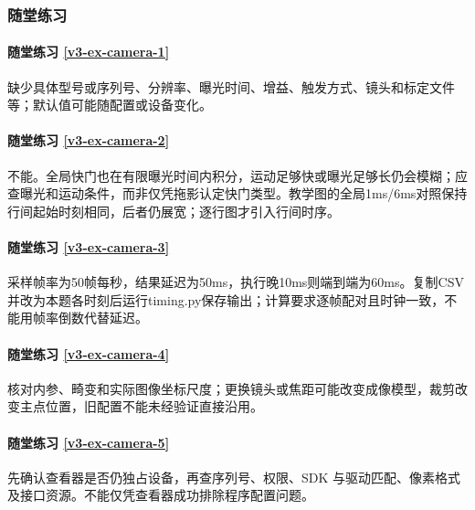 \subsubsection*{随堂练习}
\paragraph*{随堂练习 \ref{v3-ex-camera-1}}
\begin{solution}
缺少具体型号或序列号、分辨率、曝光时间、增益、触发方式、镜头和标定文件等；默认值可能随配置或设备变化。
\end{solution}

\paragraph*{随堂练习 \ref{v3-ex-camera-2}}
\begin{solution}
不能。全局快门也在有限曝光时间内积分，运动足够快或曝光足够长仍会模糊；应查曝光和运动条件，而非仅凭拖影认定快门类型。教学图的全局1ms/6ms对照保持行间起始时刻相同，后者仍展宽；逐行图才引入行间时序。
\end{solution}

\paragraph*{随堂练习 \ref{v3-ex-camera-3}}
\begin{solution}
采样帧率为50帧每秒，结果延迟为50ms，执行晚10ms则端到端为60ms。复制CSV并改为本题各时刻后运行timing.py保存输出；计算要求逐帧配对且时钟一致，不能用帧率倒数代替延迟。
\end{solution}

\paragraph*{随堂练习 \ref{v3-ex-camera-4}}
\begin{solution}
核对内参、畸变和实际图像坐标尺度；更换镜头或焦距可能改变成像模型，裁剪改变主点位置，旧配置不能未经验证直接沿用。
\end{solution}

\paragraph*{随堂练习 \ref{v3-ex-camera-5}}
\begin{solution}
先确认查看器是否仍独占设备，再查序列号、权限、SDK 与驱动匹配、像素格式及接口资源。不能仅凭查看器成功排除程序配置问题。
\end{solution}

